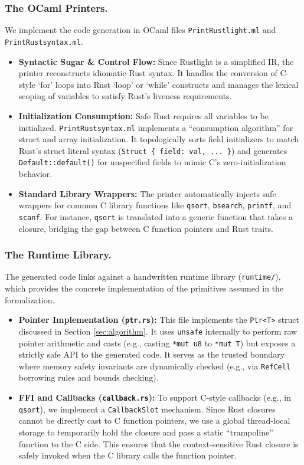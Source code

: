 \documentclass{llncs} %
\begin{document}
\subsubsection{The OCaml Printers.}
We implement the code generation in OCaml files \texttt{PrintRustlight.ml} and \texttt{PrintRustsyntax.ml}.
\begin{itemize}
    \item \textbf{Syntactic Sugar \& Control Flow:} Since Rustlight is a simplified IR, the printer reconstructs idiomatic Rust syntax. It handles the conversion of C-style `for' loops into Rust `loop' or `while' constructs and manages the lexical scoping of variables to satisfy Rust's liveness requirements.
    \item \textbf{Initialization Consumption:} Safe Rust requires all variables to be initialized. \texttt{PrintRustsyntax.ml} implements a ``consumption algorithm'' for struct and array initialization. It topologically sorts field initializers to match Rust's struct literal syntax (\texttt{Struct \{ field: val, ... \}}) and generates \texttt{Default::default()} for unspecified fields to mimic C's zero-initialization behavior.
    \item \textbf{Standard Library Wrappers:} The printer automatically injects safe wrappers for common C library functions like \texttt{qsort}, \texttt{bsearch}, \texttt{printf}, and \texttt{scanf}. For instance, \texttt{qsort} is translated into a generic function that takes a closure, bridging the gap between C function pointers and Rust traits.
\end{itemize}

\subsubsection{The Runtime Library.}
The generated code links against a handwritten runtime library (\texttt{runtime/}), which provides the concrete implementation of the primitives assumed in the formalization.

\begin{itemize}
    \item \textbf{Pointer Implementation (\texttt{ptr.rs}):} This file implements the \texttt{Ptr<T>} struct discussed in Section \ref{sec:algorithm}. It uses \texttt{unsafe} internally to perform raw pointer arithmetic and casts (e.g., casting \texttt{*mut u8} to \texttt{*mut T}) but exposes a strictly safe API to the generated code. It serves as the trusted boundary where memory safety invariants are dynamically checked (e.g., via \texttt{RefCell} borrowing rules and bounds checking).
    \item \textbf{FFI and Callbacks (\texttt{callback.rs}):} To support C-style callbacks (e.g., in \texttt{qsort}), we implement a \texttt{CallbackSlot} mechanism. Since Rust closures cannot be directly cast to C function pointers, we use a global thread-local storage to temporarily hold the closure and pass a static ``trampoline'' function to the C side. This ensures that the context-sensitive Rust closure is safely invoked when the C library calls the function pointer.
\end{itemize}
\end{document}
